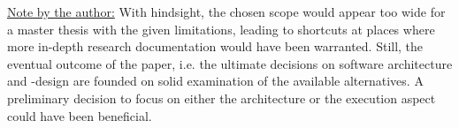 \underline{Note by the author:} With hindsight, the chosen scope would appear too wide for a master thesis with the given limitations, leading to shortcuts at places where more in-depth research documentation would have been warranted. Still, the eventual outcome of the paper, i.e. the ultimate decisions on software architecture and -design are founded on solid examination of the available alternatives. A preliminary decision to focus on either the architecture or the execution aspect could have been beneficial.
